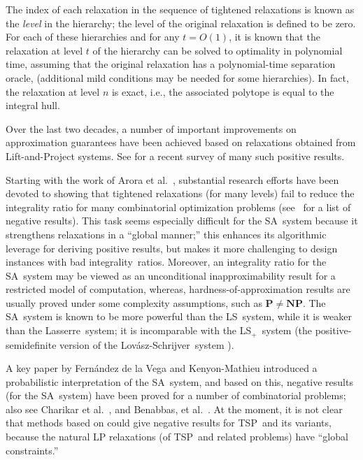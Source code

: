 \documentclass[11pt]{article}
\newcommand{\ls}{\textsf{Lov\'asz-Schrijver}}
\newcommand{\la}{\textsf{Lasserre}}
\newcommand{\iLS}{\textsf{LS}}
\newcommand{\iLSp}{\textsf{LS}$_+$}
\newcommand{\iSA}{\textsf{SA}}
\newcommand{\tsp}{\textsc{TSP}}
\renewcommand{\P}{$\mathbf{P}$}
\newcommand{\NP}{$\mathbf{NP}$}
\begin{document}
The index of each relaxation in the sequence of tightened relaxations
is known as the \textit{level} in the hierarchy; the level of the
original relaxation is defined to be zero.
For each of these hierarchies and for any $t=O(1)$,
it is known that
the relaxation at level $t$ of
the hierarchy can be solved to optimality in polynomial time,
assuming that the original relaxation has
a polynomial-time separation oracle,
\cite{tourlakisthesis06}
(additional mild conditions may be needed for some hierarchies).
In fact, the relaxation at level $n$ is exact, i.e.,
the associated polytope is equal to the integral hull.


Over the last two decades,
a number of important improvements on approximation guarantees have
been achieved based on relaxations obtained from Lift-and-Project
systems.
See \cite{CM-chapter} for a recent survey of many such positive results.


Starting with the work of Arora et al.~\cite{ABLT06},
substantial research efforts have been devoted to
showing that tightened relaxations (for many levels) fail to reduce
the integrality ratio for many combinatorial optimization problems
(see~\cite{CM-chapter} for a list of negative results).
This task seems especially difficult for
the \iSA\ system because it strengthens
relaxations in a ``global manner;''
this enhances its algorithmic leverage for deriving positive results,
but makes it more challenging
to design instances with bad integrality~ratios.
Moreover, an integrality ratio for the \iSA\ system may be viewed as an
unconditional inapproximability result for a restricted model of
computation, whereas, hardness-of-approximation results are usually
proved under some complexity assumptions, such as {\P}$\not=${\NP}.
The \iSA\ system is known to be more powerful than
the \iLS\ system, while it is weaker than the \la\ system;
it is incomparable with the \iLSp\ system
(the positive-semidefinite version of the \ls\ system \cite{LS91}).



A key paper by Fern\'andez de la Vega and Kenyon-Mathieu \cite{FK07}
introduced a probabilistic interpretation of the \iSA\ system, and
based on this, negative results (for the \iSA\ system) have been proved
for a number of combinatorial problems;
also see
Charikar et al.~\cite{CMM09}, and Benabbas, et al.~\cite{BCGM11}.
At the moment, it is not clear that methods based on \cite{FK07} could
give negative results for \tsp\ and its variants, because the natural
LP relaxations (of \tsp\ and related problems) have ``global
constraints.''
\end{document}
